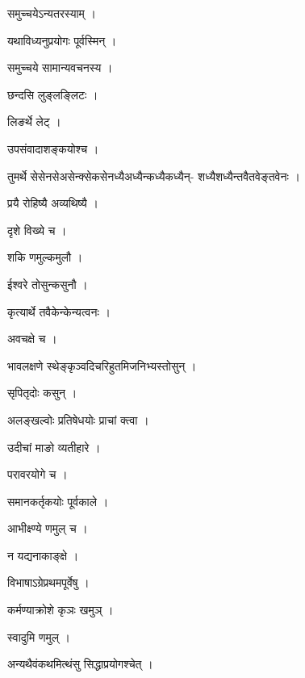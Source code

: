 \documentclass[10pt, openany]{book}
\begin{document}
\noindent समुच्चयेऽन्यतरस्याम् ।

\noindent यथाविध्यनुप्रयोगः पूर्वस्मिन् ।

\noindent समुच्चये सामान्यवचनस्य ।

\noindent छन्दसि लुङ्लङ्लिटः ।

\noindent लिङर्थे लेट् ।

\noindent उपसंवादाशङ्कयोश्च ।

\noindent तुमर्थे सेसेनसेअसेन्क्सेकसेनध्यैअध्यैन्कध्यैकध्यैन्- शध्यैशध्यैन्तवैतवेङ्तवेनः ।

\noindent प्रयै रोहिष्यै अव्यथिष्यै ।

\noindent दृशे विख्ये च ।

\noindent शकि णमुल्कमुलौ ।

\noindent ईश्वरे तोसुन्कसुनौ ।

\noindent कृत्यार्थे तवैकेन्केन्यत्वनः ।

\noindent अवचक्षे च ।

\noindent भावलक्षणे स्थेङ्कृञ्वदिचरिहुतमिजनिभ्यस्तोसुन् ।

\noindent सृपितृदोः कसुन् ।

\noindent अलङ्खल्वोः प्रतिषेधयोः प्राचां क्त्वा ।

\noindent उदीचां माङो व्यतीहारे ।

\noindent परावरयोगे च ।

\noindent समानकर्तृकयोः पूर्वकाले ।

\noindent आभीक्ष्ण्ये णमुल् च ।

\noindent न यद्यनाकाङ्क्षे ।

\noindent विभाषाऽग्रेप्रथमपूर्वेषु ।

\noindent कर्मण्याक्रोशे कृञः खमुञ् ।

\noindent स्वादुमि णमुल् ।

\noindent अन्यथैवंकथमित्थंसु सिद्धाप्रयोगश्चेत् ।
\end{document}
